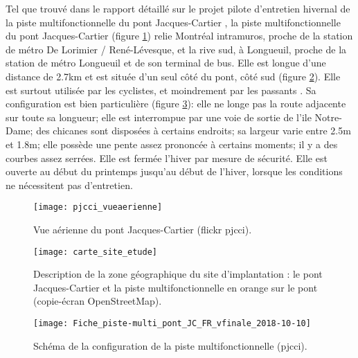﻿Tel que trouvé dans le rapport détaillé sur le projet pilote d'entretien hivernal de la piste multifonctionnelle du pont Jacques-Cartier \parencite{pjcci_rapport_2018}, la piste multifonctionnelle du pont Jacques-Cartier (figure \ref{fig:pjcci_vueaerienne}) relie Montréal intramuros, proche de la station de métro De Lorimier / René-Lévesque, et la rive sud, à Longueuil, proche de la station de métro Longueuil et de son terminal de bus. Elle est longue d'une distance de 2.7km et est située d'un seul côté du pont, côté sud (figure \ref{fig:carte_site_etude_openstreetmap}). Elle est surtout utilisée par les cyclistes, et moindrement par les passants \parencite{pjcci_rapport_2018}.
Sa configuration est bien particulière \parencite{pjcci_fiche_2018} (figure \ref{fig:Fiche_piste-multi_pont_JC_FR_vfinale_2018-10-10}): elle ne longe pas la route adjacente sur toute sa longueur; elle est interrompue par une voie de sortie de l'ile Notre-Dame; des chicanes sont disposées à certains endroits; sa largeur varie entre 2.5m et 1.8m; elle possède une pente assez prononcée à certains moments; il y a des courbes assez serrées.
Elle est fermée l'hiver par mesure de sécurité. Elle est ouverte au début du printemps jusqu'au début de l'hiver, lorsque les conditions ne nécessitent pas d'entretien.
\begin{figure}[H]
    \centering
    \texttt{[image: pjcci\_vueaerienne]}
    \caption[Vue aérienne du pont Jacques-Cartier]{Vue aérienne du pont Jacques-Cartier (flickr \acrshort{pjcci})\protect\footnotemark.}
    \label{fig:pjcci_vueaerienne}
\end{figure}
\begin{figure}[H]
    \centering
    \texttt{[image: carte\_site\_etude]}
    \caption[Carte du site d'implantation]{Description de la zone géographique du site d'implantation : le pont Jacques-Cartier et la piste multifonctionnelle en orange sur le pont (copie-écran OpenStreetMap).}
    \label{fig:carte_site_etude_openstreetmap}
\end{figure}
\begin{figure}[H]
    \centering
    \texttt{[image: Fiche\_piste-multi\_pont\_JC\_FR\_vfinale\_2018-10-10]}
    \caption[Schéma de la configuration de la piste multifonctionnelle]{Schéma de la configuration de la piste multifonctionnelle (\acrshort{pjcci})\protect\footnotemark.}
    \label{fig:Fiche_piste-multi_pont_JC_FR_vfinale_2018-10-10}
\end{figure}
